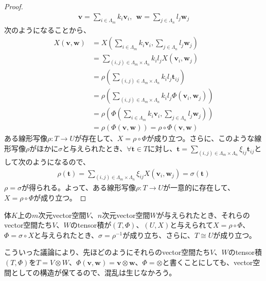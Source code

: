 \documentclass[dvipdfmx]{jsarticle}
\begin{document}
\begin{proof}
\begin{align*}
\mathbf{v} = \sum_{i \in \varLambda_{m}} {k_{i}\mathbf{v}_{i}},\ \ \mathbf{w} = \sum_{j \in \varLambda_{n}} {l_{j}\mathbf{w}_{j}}
\end{align*}
次のようになることから、
\begin{align*}
X\left( \mathbf{v},\mathbf{w} \right) &= X\left( \sum_{i \in \varLambda_{m}} {k_{i}\mathbf{v}_{i}},\sum_{j \in \varLambda_{n}} {l_{j}\mathbf{w}_{j}} \right)\\
&= \sum_{(i,j) \in \varLambda_{m} \times \varLambda_{n}} {k_{i}l_{j}X\left( \mathbf{v}_{i},\mathbf{w}_{j} \right)}\\
&= \rho\left( \sum_{(i,j) \in \varLambda_{m} \times \varLambda_{n}} {k_{i}l_{j}\mathbf{t}_{ij}} \right)\\
&= \rho\left( \sum_{(i,j) \in \varLambda_{m} \times \varLambda_{n}} {k_{i}l_{j}\varPhi\left( \mathbf{v}_{i},\mathbf{w}_{j} \right)} \right)\\
&= \rho\left( \varPhi\left( \sum_{i \in \varLambda_{m}} {k_{i}\mathbf{v}_{i}},\sum_{j \in \varLambda_{n}} {l_{j}\mathbf{w}_{j}} \right) \right)\\
&= \rho\left( \varPhi\left( \mathbf{v},\mathbf{w} \right) \right) = \rho \circ \varPhi\left( \mathbf{v},\mathbf{w} \right)
\end{align*}
ある線形写像$\rho:T \rightarrow U$が存在して、$X = \rho \circ \varPhi$が成り立つ。さらに、このような線形写像$\rho$がほかに$\sigma$と与えられたとき、$\forall\mathbf{t} \in T$に対し、$\mathbf{t} = \sum_{(i,j) \in \varLambda_{m} \times \varLambda_{n}} {\xi_{ij}\mathbf{t}_{ij}}$として次のようになるので、
\begin{align*}
\rho\left( \mathbf{t} \right) = \sum_{(i,j) \in \varLambda_{m} \times \varLambda_{n}} {\xi_{ij}X\left( \mathbf{v}_{i},\mathbf{w}_{j} \right)} = \sigma\left( \mathbf{t} \right)
\end{align*}
$\rho = \sigma$が得られる。よって、ある線形写像$\rho:T \rightarrow U$が一意的に存在して、$X = \rho \circ \varPhi$が成り立つ。
\end{proof}
\begin{thm}\label{2.4.5.4}
体$K$上の$m$次元vector空間$V$、$n$次元vector空間$W$が与えられたとき、それらのvector空間たち$V$、$W$のtensor積が$(T,\varPhi)$、$(U,X)$と与えられて$X = \rho \circ \varPhi$、$\varPhi = \sigma \circ X$と与えられたとき、$\sigma = \rho^{- 1}$が成り立ち、さらに、$T \cong U$が成り立つ。\par
こういった議論により、先ほどのようにそれらのvector空間たち$V$、$W$のtensor積$(T,\varPhi)$を$T = V \otimes W$、$\varPhi\left( \mathbf{v},\mathbf{w} \right) = \mathbf{v} \otimes \mathbf{w}$、$\varPhi = \otimes$と書くことにしても、vector空間としての構造が保てるので、混乱は生じなかろう。
\end{thm}
\end{document}
